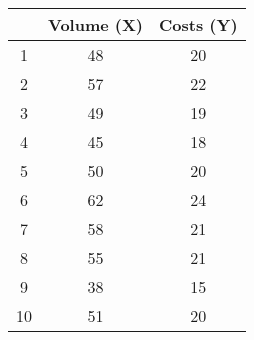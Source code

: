 \documentclass[]{report}
\begin{document}
\begin{center}
	
	\begin{tabular}{|c|c|c|}\hline
		&  Volume (X)   &  Costs (Y) \\ \hline
		1     &     48     &   20 \\
		2     &    57      &   22 \\
		3     &    49      &   19 \\
		4     &    45      &   18 \\
		5     &    50      &   20 \\
		6     &    62      &   24 \\
		7     &    58      &   21 \\
		8     &    55      &   21 \\
		9     &    38      &   15 \\
		10    &    51      &  20 \\ \hline
	\end{tabular}
\end{center}











%











\end{document}
